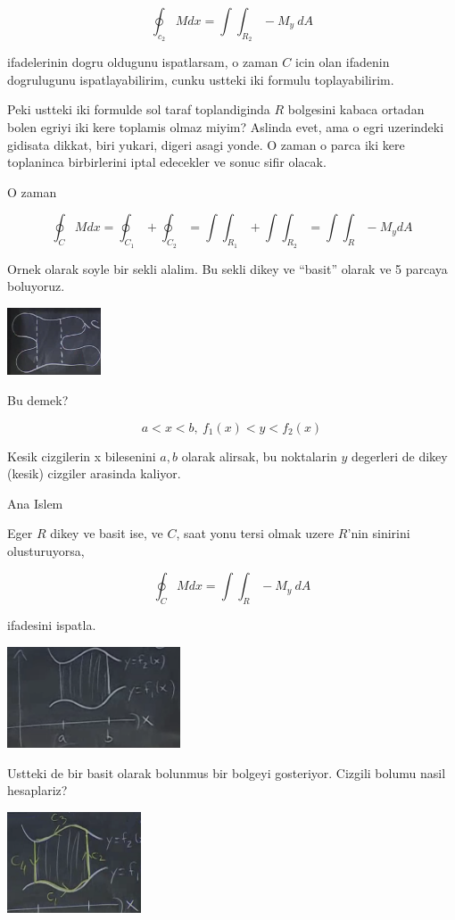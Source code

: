 \documentclass[12pt,fleqn]{article}
\begin{document}
\[ \oint_{c_2} M dx  = \int \int_{R_2} -M_y \ dA \]

ifadelerinin dogru oldugunu ispatlarsam, o zaman $C$ icin olan ifadenin
dogrulugunu ispatlayabilirim, cunku ustteki iki formulu toplayabilirim. 

Peki ustteki iki formulde sol taraf toplandiginda $R$ bolgesini kabaca
ortadan bolen egriyi iki kere toplamis olmaz miyim? Aslinda evet, ama o
egri uzerindeki gidisata dikkat, biri yukari, digeri asagi yonde. O zaman o
parca iki kere toplaninca birbirlerini iptal edecekler ve sonuc sifir olacak.

O zaman 

\[ \oint_C M dx = \oint_{C_1} + \oint_{C_2} =
\int \int_{R_1} + \int \int_{R_2} = 
\int \int_R -M_ydA
\]

Ornek olarak soyle bir sekli alalim. Bu sekli dikey ve ``basit'' olarak ve
5 parcaya boluyoruz.

\includegraphics[height=2cm]{22_6.png}

Bu demek? 

\[ a < x < b, \ f_1(x) < y < f_2(x) \]

Kesik cizgilerin x bilesenini $a,b$ olarak alirsak, bu noktalarin $y$
degerleri de dikey (kesik) cizgiler arasinda kaliyor. 

Ana Islem

Eger $R$ dikey ve basit ise, ve $C$, saat yonu tersi olmak uzere $R$'nin
sinirini olusturuyorsa, 

\[ \oint_C M dx  = \int \int_R -M_y \ dA \]

ifadesini ispatla. 

\includegraphics[height=3cm]{22_7.png}

Ustteki de bir basit olarak bolunmus bir bolgeyi gosteriyor. Cizgili bolumu
nasil hesaplariz? 

\includegraphics[height=3cm]{22_8.png}
\end{document}
